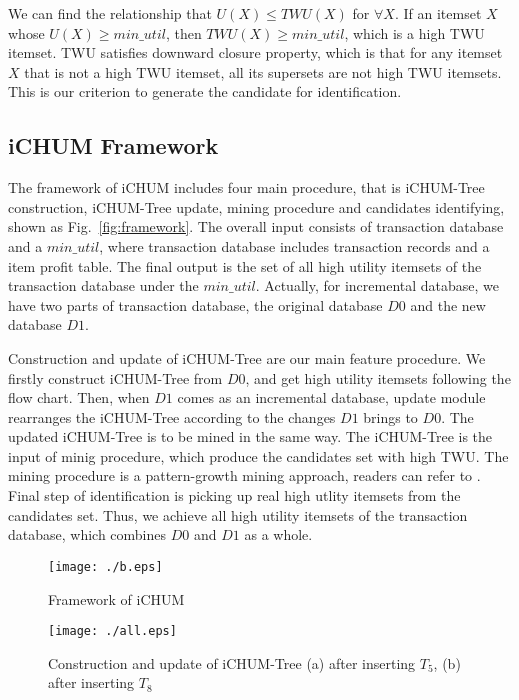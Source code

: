 \documentclass[runningheads,a4paper]{llncs}
\begin{document}
We can find the relationship that $ U(X) \leqslant TWU(X) $ for $ \forall X $. If an itemset $ X$ whose $ U(X) \geqslant min\_util $, then $ TWU(X) \geqslant min\_util $, which is a high TWU itemset. TWU satisfies downward closure property, which is that for any itemset $ X $ that is not a high TWU itemset, all its supersets are not high TWU itemsets. This is our criterion to generate the candidate for identification.

\subsection{iCHUM Framework}
The framework of iCHUM includes four main procedure, that is iCHUM-Tree construction, iCHUM-Tree update, mining procedure and candidates identifying, shown as Fig.~\ref{fig:framework}. The overall input consists of transaction database and a $ min\_util $, where transaction database includes transaction records and a item profit table. The final output is the set of all high utility itemsets of the transaction database under the $ min\_util $. Actually, for incremental database, we have two parts of transaction database, the original database $ D0 $ and the new database $ D1 $. 

Construction and update of iCHUM-Tree are our main feature procedure. We firstly construct iCHUM-Tree from $ D0 $, and get high utility itemsets following the flow chart. Then, when $ D1 $ comes as an incremental database, update module rearranges the iCHUM-Tree according to the changes $ D1 $ brings to $ D0 $. The updated iCHUM-Tree is to be mined in the same way. The iCHUM-Tree is the input of minig procedure, which produce the candidates set with high TWU. The mining procedure is a pattern-growth mining approach, readers can refer to \cite{Ahmed:IHUP}. Final step of identification is picking up real high utlity itemsets from the candidates set. Thus, we achieve all high utility itemsets of the transaction database, which combines $ D0 $ and $ D1 $ as a whole.

\begin{figure}
\centering
\begin{minipage}[b]{0.4\textwidth}
\centering
\texttt{[image: ./b.eps]}
\caption{Framework of iCHUM}
\label{fig:framework}
\end{minipage}
\begin{minipage}[b]{0.56\textwidth}
\centering
\texttt{[image: ./all.eps]}
\caption{Construction and update of iCHUM-Tree (a) after inserting $ T_{5} $, (b) after inserting $ T_{8} $}
\label{fig:tree}
\end{minipage}
\end{figure}
\end{document}
